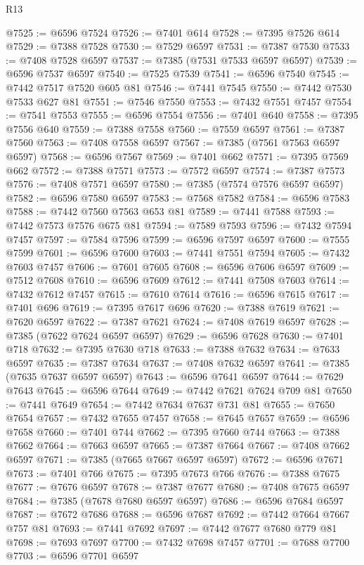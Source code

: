 \begin{lexlean}{R13}
\begin{coremodule}
@7525 := @6596 @7524
@7526 := @7401 @614
@7528 := @7395 @7526 @614
@7529 := @7388 @7528
@7530 := @7529 @6597
@7531 := @7387 @7530
@7533 := @7408 @7528 @6597
@7537 := @7385 (@7531 @7533 @6597 @6597)
@7539 := @6596 @7537 @6597
@7540 := @7525 @7539
@7541 := @6596 @7540
@7545 := @7442 @7517 @7520 @605 @81
@7546 := @7441 @7545
@7550 := @7442 @7530 @7533 @627 @81
@7551 := @7546 @7550
@7553 := @7432 @7551 @7457
@7554 := @7541 @7553
@7555 := @6596 @7554
@7556 := @7401 @640
@7558 := @7395 @7556 @640
@7559 := @7388 @7558
@7560 := @7559 @6597
@7561 := @7387 @7560
@7563 := @7408 @7558 @6597
@7567 := @7385 (@7561 @7563 @6597 @6597)
@7568 := @6596 @7567
@7569 := @7401 @662
@7571 := @7395 @7569 @662
@7572 := @7388 @7571
@7573 := @7572 @6597
@7574 := @7387 @7573
@7576 := @7408 @7571 @6597
@7580 := @7385 (@7574 @7576 @6597 @6597)
@7582 := @6596 @7580 @6597
@7583 := @7568 @7582
@7584 := @6596 @7583
@7588 := @7442 @7560 @7563 @653 @81
@7589 := @7441 @7588
@7593 := @7442 @7573 @7576 @675 @81
@7594 := @7589 @7593
@7596 := @7432 @7594 @7457
@7597 := @7584 @7596
@7599 := @6596 @7597 @6597
@7600 := @7555 @7599
@7601 := @6596 @7600
@7603 := @7441 @7551 @7594
@7605 := @7432 @7603 @7457
@7606 := @7601 @7605
@7608 := @6596 @7606 @6597
@7609 := @7512 @7608
@7610 := @6596 @7609
@7612 := @7441 @7508 @7603
@7614 := @7432 @7612 @7457
@7615 := @7610 @7614
@7616 := @6596 @7615
@7617 := @7401 @696
@7619 := @7395 @7617 @696
@7620 := @7388 @7619
@7621 := @7620 @6597
@7622 := @7387 @7621
@7624 := @7408 @7619 @6597
@7628 := @7385 (@7622 @7624 @6597 @6597)
@7629 := @6596 @7628
@7630 := @7401 @718
@7632 := @7395 @7630 @718
@7633 := @7388 @7632
@7634 := @7633 @6597
@7635 := @7387 @7634
@7637 := @7408 @7632 @6597
@7641 := @7385 (@7635 @7637 @6597 @6597)
@7643 := @6596 @7641 @6597
@7644 := @7629 @7643
@7645 := @6596 @7644
@7649 := @7442 @7621 @7624 @709 @81
@7650 := @7441 @7649
@7654 := @7442 @7634 @7637 @731 @81
@7655 := @7650 @7654
@7657 := @7432 @7655 @7457
@7658 := @7645 @7657
@7659 := @6596 @7658
@7660 := @7401 @744
@7662 := @7395 @7660 @744
@7663 := @7388 @7662
@7664 := @7663 @6597
@7665 := @7387 @7664
@7667 := @7408 @7662 @6597
@7671 := @7385 (@7665 @7667 @6597 @6597)
@7672 := @6596 @7671
@7673 := @7401 @766
@7675 := @7395 @7673 @766
@7676 := @7388 @7675
@7677 := @7676 @6597
@7678 := @7387 @7677
@7680 := @7408 @7675 @6597
@7684 := @7385 (@7678 @7680 @6597 @6597)
@7686 := @6596 @7684 @6597
@7687 := @7672 @7686
@7688 := @6596 @7687
@7692 := @7442 @7664 @7667 @757 @81
@7693 := @7441 @7692
@7697 := @7442 @7677 @7680 @779 @81
@7698 := @7693 @7697
@7700 := @7432 @7698 @7457
@7701 := @7688 @7700
@7703 := @6596 @7701 @6597

\end{coremodule}
\end{lexlean}
